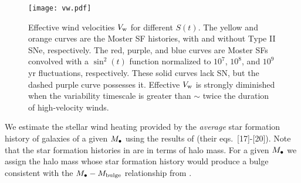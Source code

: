 \begin{figure}
\texttt{[image: vw.pdf]}
\caption{\label{NickPlot2} Effective wind velocities $V_{\rm w}$ for
different $S(t)$.  The yellow and orange curves are the Moster SF
histories, with and without Type II SNe, respectively.  The red,
purple, and blue curves are Moster SFs convolved with a $\sin^2(t)$
function normalized to $10^7$, $10^8$, and $10^9$ yr fluctuations,
respectively.  These solid curves lack SN, but the dashed purple curve
possesses it.  Effective $V_{\rm w}$ is strongly diminished when the
variability timescale is greater than $\sim$ twice the duration of
high-velocity winds.}
\end{figure}

We estimate the stellar wind heating provided by the {\it average}
star formation history of galaxies of a given $M_{\bullet}$ using the results
of \citet{MosterNaab+:2013a} (their eqs.~[17]-[20]).  Note that the
star formation histories in \citet{MosterNaab+:2013a} are in terms of
halo mass. For a given $M_{\bullet}$ we assign the halo mass whose star
formation history would produce a bulge consistent with the
$M_{\bullet}-M_{\rm bulge}$ relationship from \citet{McConnellMa:2013a}.


